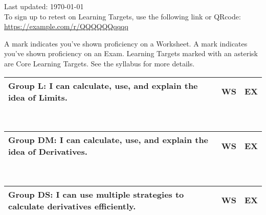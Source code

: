 \def\WS{\sffamily{}WS}
\def\EX{\sffamily{}EX}

\begin{minipage}{0.88\linewidth}
Last updated: \today\\

To sign up to retest on Learning Targets, use the following link or QRcode:\\
\url{https://example.com/r/QQQQQQqqqq}
\end{minipage}
\begin{minipage}{0.08\linewidth}
\end{minipage}


A \raisebox{-3pt}{\cxI} mark indicates you've shown proficiency on a Worksheet.
A \raisebox{-3pt}{\bxI} mark indicates you've shown proficiency on an Exam.
Learning Targets marked with an asterisk \textbf{\sffamily\LImarker} are Core Learning Targets.
See the syllabus for more details.


\begin{tabular}{@{}m{}m{}m{}@{}}%
  Group L: I can calculate, use, and explain the idea of Limits. & \WS & \EX\\
  \hline
\end{tabular}\\[0.1em]
\LI
\LII
\LIII
\LV

\vfill

\begin{tabular}{@{}m{}m{}m{}@{}}%
  Group DM: I can calculate, use, and explain the idea of Derivatives. & \WS & \EX\\
  \hline
\end{tabular}\\[0.1em]
\DMI
\DMII
\DMIV
\DMV

\vfill

\begin{tabular}{@{}m{}m{}m{}@{}}%
  Group DS: I can use multiple strategies to calculate derivatives efficiently.
  & \WS & \EX\\
  \hline
\end{tabular}\\[0.1em]
\DSII
\DSIII
\DSIV
\DSV

\vfill
\vfill

\newpage



